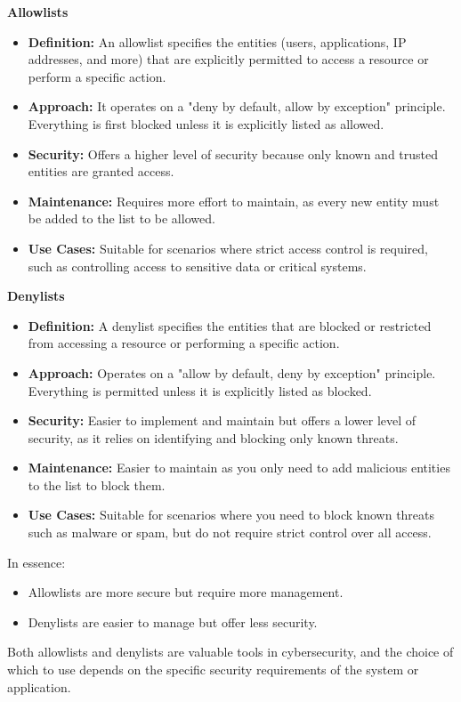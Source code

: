 \textbf{Allowlists}
\begin{itemize}
    \item \textbf{Definition:} An allowlist specifies the entities (users, applications, IP addresses, and more) that are explicitly permitted to access a resource or perform a specific action.
    \item \textbf{Approach:} It operates on a "deny by default, allow by exception" principle. Everything is first blocked unless it is explicitly listed as allowed.
    \item \textbf{Security:} Offers a higher level of security because only known and trusted entities are granted access.
    \item \textbf{Maintenance:} Requires more effort to maintain, as every new entity must be added to the list to be allowed.
    \item \textbf{Use Cases:} Suitable for scenarios where strict access control is required, such as controlling access to sensitive data or critical systems.
\end{itemize}
\textbf{Denylists}
\begin{itemize}
    \item \textbf{Definition:} A denylist specifies the entities that are blocked or restricted from accessing a resource or performing a specific action.
    \item \textbf{Approach:} Operates on a "allow by default, deny by exception" principle. Everything is permitted unless it is explicitly listed as blocked.
    \item \textbf{Security:} Easier to implement and maintain but offers a lower level of security, as it relies on identifying and blocking only known threats.
    \item \textbf{Maintenance:} Easier to maintain as you only need to add malicious entities to the list to block them.
    \item \textbf{Use Cases:} Suitable for scenarios where you need to block known threats such as malware or spam, but do not require strict control over all access.
\end{itemize}
In essence:
\begin{itemize}
    \item Allowlists are more secure but require more management.
    \item Denylists are easier to manage but offer less security.
\end{itemize}
Both allowlists and denylists are valuable tools in cybersecurity, and the choice of which to use depends on the specific security requirements of the system or application.

